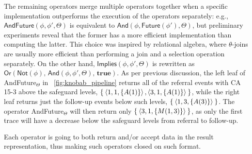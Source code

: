 The remaining operators merge multiple operators together when 
a specific implementation outperforms
the execution of the operators separately:
 e.g., $\textsf{AndFuture}(\phi,\phi',\Theta)$ is equivalent to $\textsf{And}(\phi,\textsf{Future}(\phi'),\Theta)$, but preliminary experiments reveal that the former has a more efficient implementation than computing the latter. This choice was inspired by relational algebra, where $\theta$-joins are usually more efficient than performing a join and a selection operation separately.
 On the other hand, %
 $\textsf{Implies}(\phi,\phi',\Theta)$ is rewritten as $\textsf{Or}(\textsf{Not}(\phi),\,\textsf
{And}(\phi,\phi',\Theta),\,\textbf{true})$. As per previous discussion, the left leaf of \textsf{AndFuture}$_\Theta$ in \figurename~\ref{fig:knobab_pipeline} returns all of the referral events with CA 15-3 above the safeguard levels, $\Set{\braket{1,1,\{A(1)\}},\braket{3,1,\{A(1)\}}}$, while the right leaf returns just the follow-up events below such levels, $\Set{\braket{1,3,\{A(3)\}}}$. The operator \textsf{AndFuture}$_\Theta$ will then return only $\Set{\braket{3,1,\{M(1,3)\}}}$, as only the first trace will have a decrease below the safeguard levels from referral to follow-up.


Each \xLTLf operator is going to both return and/or accept data in the result representation, thus making such operators closed on such format.





